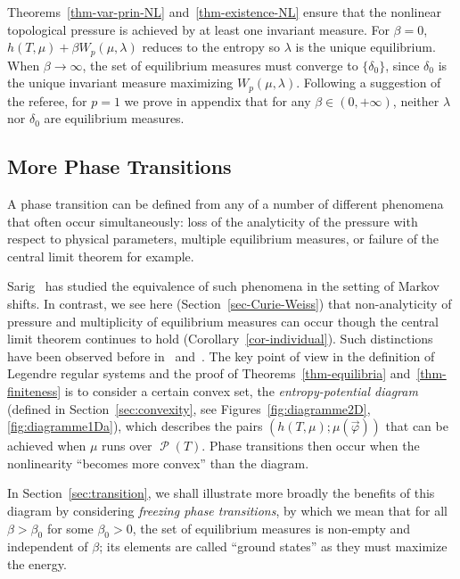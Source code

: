 \documentclass[AHL, Unicode, longabstracts,published]{cedram}
\theoremstyle{plain}
\theoremstyle{plain}
\newcommand\Prob{{\operatorname{\mathscr{P}}}}
\newcommand{\pot}{\varphi}
\newcounter{In}
\newcommand*\8{\infty}
\begin{document}
Theorems~\ref{thm-var-prin-NL} and~\ref{thm-existence-NL} ensure that the nonlinear topological pressure is achieved by at least one invariant measure. For $\beta=0$, $h(T,\mu)+\beta W_p(\mu,\lambda)$ reduces to the entropy so $\lambda$ is the unique equilibrium. When $\beta\to\infty$, the set of equilibrium measures must converge to $\{\delta_0\}$, since $\delta_0$ is the unique invariant measure maximizing $W_p(\mu,\lambda)$. Following a suggestion of the referee, for $p=1$ we prove in appendix that for any $\beta\in(0,+\infty)$, neither $\lambda$ nor $\delta_0$ are equilibrium measures.



\subsection{More Phase Transitions}\label{subsec-comments}
A phase transition can be defined from any of a number of different phenomena that often { occur simultaneously}: loss of the analyticity of the pressure with respect to physical parameters, multiple equilibrium measures, or failure of the central limit theorem for example.

Sarig~\cite{Sarig-2001-PhaseTransitions} has studied the equivalence of such phenomena in the setting of Markov shifts. In contrast, we see here (Section~\ref{sec-Curie-Weiss}) that non-analyticity of pressure and multiplicity of equilibrium measures can occur though the central limit theorem continues to hold (Corollary~\ref{cor-individual}). Such distinctions have been observed before in~\cite{leplaideur-butterfly} and~\cite{thaler}. The key point of view in the definition of Legendre regular systems and the proof of Theorems~\ref{thm-equilibria} and~\ref{thm-finiteness} is to consider a certain convex set, the \emph{entropy-potential diagram} (defined in Section~\ref{sec:convexity}, see Figures~\ref{fig:diagramme2D}, \ref{fig:diagramme1Da}), which describes the pairs $(h(T,\mu);\mu(\vec\pot))$ that can be achieved when $\mu$ runs over $\Prob(T)$. Phase transitions then occur when the nonlinearity ``becomes more convex'' than the diagram.

In Section~\ref{sec:transition}, we shall illustrate more broadly the benefits of this diagram by considering \emph{freezing phase transitions}, by which we mean that for all $\beta>\beta_0$ for some $\beta_0>0$, the set of equilibrium measures is non-empty and independent of $\beta$; its elements are called ``ground states'' as they must maximize the energy.
\end{document}
